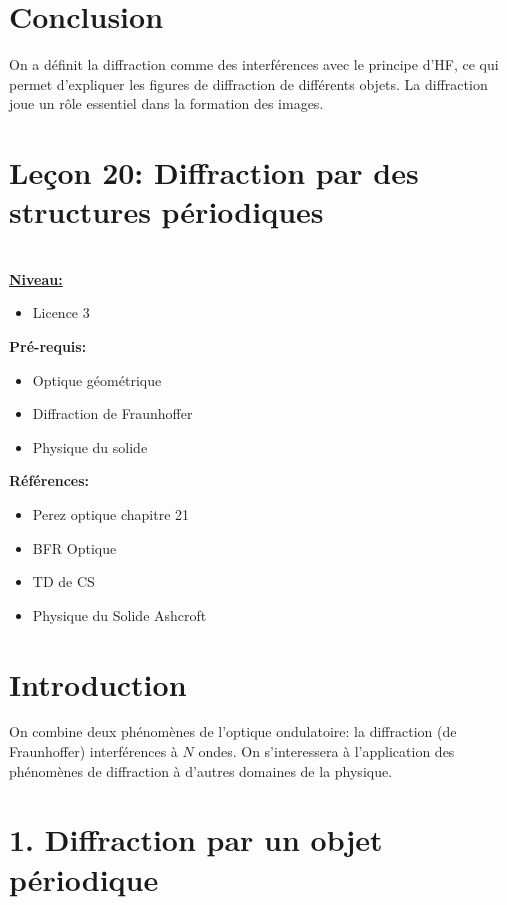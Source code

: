\documentclass[french, a4paper, 10pt, twocolumn, landscape]{article}
\begin{document}
\section*{Conclusion}

On a définit la diffraction comme des interférences avec le principe d'HF, ce qui permet d'expliquer les figures de diffraction de différents objets. La diffraction joue un rôle essentiel dans la formation des images.

\clearpage 

\section*{Leçon 20: Diffraction par des structures périodiques}

\hrulefill\\

\noindent\underline{\textbf{Niveau:}} 
\begin{itemize}
    \item Licence 3
\end{itemize}

\textbf{Pré-requis:}
\begin{itemize}
    \item Optique géométrique
    \item Diffraction de Fraunhoffer
    \item Physique du solide
\end{itemize}

\textbf{Références:}\medskip

\begin{itemize}
\item Perez optique chapitre 21
\item BFR Optique
\item TD de CS
\item Physique du Solide Ashcroft
\end{itemize}

\hrulefill


\section*{Introduction}

On combine deux phénomènes de l'optique ondulatoire: la diffraction (de Fraunhoffer) interférences à $N$ ondes. On s'interessera à l'application des phénomènes de diffraction à d'autres domaines de la physique.

\section*{1. Diffraction par un objet périodique}
\end{document}
